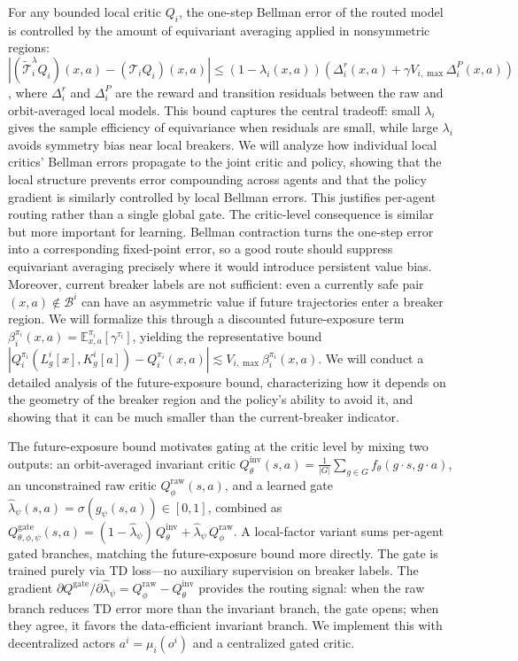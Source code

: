 \documentclass[11pt]{article}
\begin{document}
For any bounded local critic $Q_i$, the one-step Bellman error of the routed model is controlled by the amount of equivariant averaging applied in nonsymmetric regions: $|(\widetilde{\mathcal T}_i^\lambda Q_i)(x,a)-({\mathcal T}_i Q_i)(x,a)| \le (1-\lambda_i(x,a))(\Delta_i^r(x,a)+\gamma V_{i,\max}\Delta_i^P(x,a))$, where $\Delta_i^r$ and $\Delta_i^P$ are the reward and transition residuals between the raw and orbit-averaged local models. This bound captures the central tradeoff: small $\lambda_i$ gives the sample efficiency of equivariance when residuals are small, while large $\lambda_i$ avoids symmetry bias near local breakers.
We will analyze how individual local critics' Bellman errors propagate to the joint critic and policy, showing that the local structure prevents error compounding across agents and that the policy gradient is similarly controlled by local Bellman errors. This justifies per-agent routing rather than a single global gate.
The critic-level consequence is similar but more important for learning. Bellman contraction turns the one-step error into a corresponding fixed-point error, so a good route should suppress equivariant averaging precisely where it would introduce persistent value bias. Moreover, current breaker labels are not sufficient: even a currently safe pair $(x,a)\notin\mathcal B^i$ can have an asymmetric value if future trajectories enter a breaker region. We will formalize this through a discounted future-exposure term $\beta_i^{\pi_i}(x,a)=\mathbb E_{x,a}^{\pi_i}[\gamma^{\tau_i}]$, yielding the representative bound $|Q_i^{\pi_i}(L_g^i[x],K_g^i[a])-Q_i^{\pi_i}(x,a)| \lesssim V_{i,\max}\beta_i^{\pi_i}(x,a)$.
We will conduct a detailed analysis of the future-exposure bound, characterizing how it depends on the geometry of the breaker region and the policy's ability to avoid it, and showing that it can be much smaller than the current-breaker indicator.



The future-exposure bound motivates gating at the critic level by mixing two outputs: an orbit-averaged invariant critic $Q^{\text{inv}}_\theta(s, a) = \tfrac{1}{|G|}\sum_{g \in G} f_\theta(g \cdot s, g \cdot a)$, an unconstrained raw critic $Q^{\text{raw}}_\phi(s, a)$, and a learned gate $\widehat{\lambda}_\psi(s,a) = \sigma(g_\psi(s,a)) \in [0,1]$, combined as $Q^{\text{gate}}_{\theta,\phi,\psi}(s,a) = (1-\widehat{\lambda}_\psi)\,Q^{\text{inv}}_\theta + \widehat{\lambda}_\psi\,Q^{\text{raw}}_\phi$. A local-factor variant sums per-agent gated branches, matching the future-exposure bound more directly.
The gate is trained purely via TD loss—no auxiliary supervision on breaker labels. The gradient $\partial Q^{\text{gate}}/\partial \widehat{\lambda}_\psi = Q^{\text{raw}}_\phi - Q^{\text{inv}}_\theta$ provides the routing signal: when the raw branch reduces TD error more than the invariant branch, the gate opens; when they agree, it favors the data-efficient invariant branch. We implement this with decentralized actors $a^i = \mu_i(o^i)$ and a centralized gated critic.
\end{document}

